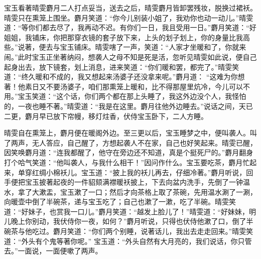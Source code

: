 \begin{parag}
    宝玉看著晴雯麝月二人打点妥当，送去之后，晴雯麝月皆卸罢残妆，脱换过裙袄。晴雯只在熏笼上围坐。麝月笑道：“你今儿别装小姐了，我劝你也动一动儿。”晴雯道：“等你们都去尽了，我再动不迟。有你们一日，我且受用一日。”麝月笑道：“好姐姐，我铺床，你把那穿衣镜的套子放下来，上头的划子划上，你的身量比我高些。”说著，便去与宝玉铺床。晴雯嗐了一声，笑道：“人家才坐暖和了，你就来闹。”此时宝玉正坐著纳闷，想袭人之母不知是死是活，忽听见晴雯如此说，便自己起身出去，放下镜套，划上消息，进来笑道：“你们暖和罢，都完了。”晴雯笑道：“终久暖和不成的，我又想起来汤婆子还没拿来呢。”麝月道： “这难为你想著！他素日又不要汤婆子，咱们那熏笼上暖和，比不得那屋里炕冷，今儿可以不用。”宝玉笑道：“这个话，你们两个都在那上头睡了，我这外边没个人，我怪怕的，一夜也睡不著。”晴雯道：“我是在这里。麝月往他外边睡去。”说话之间，天已二更，麝月早已放下帘幔，移灯炷香，伏侍宝玉卧下，二人方睡。
\end{parag}


\begin{parag}
    晴雯自在熏笼上，麝月便在暖阁外边。至三更以后，宝玉睡梦之中，便叫袭人。叫了两声，无人答应，自己醒了，方想起袭人不在家，自己也好笑起来。晴雯已醒，因笑唤麝月道：“连我都醒了，他守在旁边还不知道，真是个挺死尸的。”麝月翻身打个哈气笑道：“他叫袭人，与我什么相干！”因问作什么。宝玉要吃茶，麝月忙起来，单穿红绸小棉袄儿。宝玉道：“披上我的袄儿再去，仔细冷著。”麝月听说，回手便把宝玉披著起夜的一件貂颏满襟暖袄披上，下去向盆内洗手，先倒了一钟温水，拿了大漱盂，宝玉漱了一口；然后才向茶格上取了茶碗，先用温水涮了一涮，向暖壶中倒了半碗茶，递与宝玉吃了；自己也漱了一漱，吃了半碗。晴雯笑道：“好妹子，也赏我一口儿。”麝月笑道：“越发上脸儿了！”晴雯道：“好妹妹，明儿晚上你别动，我伏侍你一夜，如何？”麝月听说，只得也伏侍他漱了口，倒了半碗茶与他吃过。麝月笑道：“你们两个别睡，说著话儿，我出去走走回来。”晴雯笑道：“外头有个鬼等著你呢。” 宝玉道：“外头自然有大月亮的，我们说话，你只管去。”一面说，一面便嗽了两声。
\end{parag}



